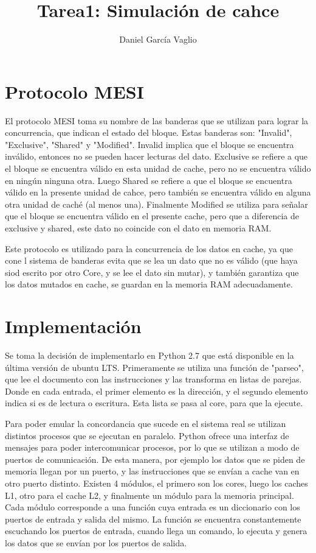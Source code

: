 \documentclass {article}
\begin{document}
\title{Tarea1: Simulación de cahce}
\author{Daniel García Vaglio}
\maketitle



\section{Protocolo MESI}
El protocolo MESI toma su nombre de las banderas que se utilizan para lograr la concurrencia, que
indican el estado del bloque. Estas banderas son: "Invalid", "Exclusive", "Shared" y
"Modified". Invalid implica que el bloque se encuentra inválido, entonces no se pueden hacer
lecturas del dato. Exclusive se refiere a que el bloque se encuentra válido en esta unidad de cache,
pero no se encuentra válido en ningún ninguna otra. Luego Shared se refiere a que el bloque se
encuentra válido en la presente unidad de cahce, pero también se encuentra válido en alguna otra
unidad de caché (al menos una). Finalmente Modified se utiliza para señalar que el bloque se
encuentra válido en el presente cache, pero que a diferencia de exclusive y shared, este dato no
coincide con el dato en memoria RAM.

Este protocolo es utilizado para la concurrencia de los datos en cache, ya que cone l sistema de
banderas evita que se lea un dato que no es válido (que haya siod escrito por otro Core, y se lee el
dato sin mutar), y también garantiza que los datos mutados en cache, se guardan en la memoria RAM
adecuadamente.


\section{Implementación}
Se toma la decisión de implementarlo en Python 2.7 que está disponible en la última versión de
ubuntu LTS. Primeramente se utiliza una función de "parseo", que lee el documento con las instrucciones
y las transforma en listas de parejas. Donde en cada entrada, el primer elemento es la dirección, y
el segundo elemento indica si es de lectura o escritura. Esta lista se pasa al core, para que la
ejecute.

Para poder emular la concordancia que sucede en el sistema real se utilizan distintos procesos que se
ejecutan en paralelo. Python ofrece una interfaz de mensajes para poder intercomunicar procesos, por
lo que se utilizan a modo de puertos de comunicación. De esta manera, por ejemplo los datos que se
piden de memoria llegan por un puerto, y las instrucciones que se envían a cache van en otro puerto
distinto. Existen 4 módulos, el primero son los cores, luego los caches L1, otro para el cache L2, y
finalmente un módulo para la memoria principal. Cada módulo corresponde a una función cuya entrada
es un diccionario con los puertos de entrada y salida del mismo. La función se encuentra
constantemente escuchando los puertos de entrada, cuando llega un comando, lo ejecuta y genera los
datos que se envían por los puertos de salida. 
\end{document}
